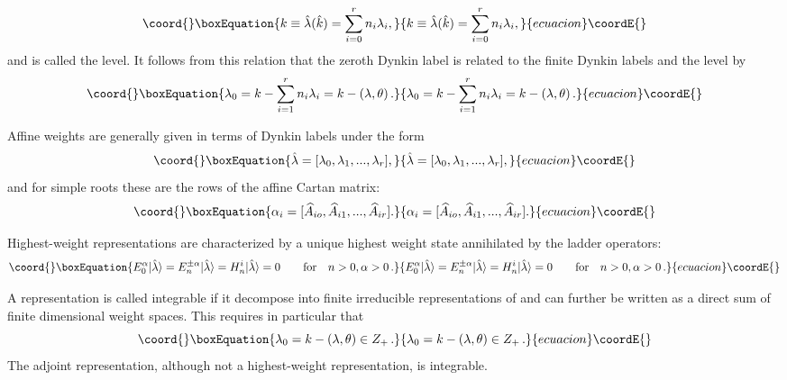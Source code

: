 \documentclass[a4paper,12pt]{report}
\begin{document}
\begin{equation}\coord{}\boxEquation{
k\equiv\hat{\lambda}(\hat{k})=\sum_{i=0}^{r}n_{i}\lambda_{i},
}{
k\equiv\hat{\lambda}(\hat{k})=\sum_{i=0}^{r}n_{i}\lambda_{i},
}{ecuacion}\coordE{}\end{equation}
and \coordHE{} is called the level. It follows from this relation that the zeroth Dynkin label \coordHE{} is related
to the finite Dynkin labels and the level by
\begin{equation}\coord{}\boxEquation{
\lambda_{0}=k-\sum_{i=1}^{r}n_{i}\lambda_{i}=k-(\lambda,\theta)\,.
}{
\lambda_{0}=k-\sum_{i=1}^{r}n_{i}\lambda_{i}=k-(\lambda,\theta)\,.
}{ecuacion}\coordE{}\end{equation}


Affine weights are generally given in terms of Dynkin labels under the form
\begin{equation}\coord{}\boxEquation{
\hat{\lambda}=[\lambda_{0},\lambda_{1},...,\lambda_{r}],
}{
\hat{\lambda}=[\lambda_{0},\lambda_{1},...,\lambda_{r}],
}{ecuacion}\coordE{}\end{equation}
and for simple roots these are the rows of the affine Cartan matrix:
\begin{equation}\coord{}\boxEquation{
\alpha_{i}=[\widehat{A}_{io},\widehat{A}_{i1},...,\widehat{A}_{ir}].
}{
\alpha_{i}=[\widehat{A}_{io},\widehat{A}_{i1},...,\widehat{A}_{ir}].
}{ecuacion}\coordE{}\end{equation}

Highest-weight representations are characterized by a unique highest weight state \myHighlight{$|\hat{\lambda}\rangle$}\coordHE{}
annihilated by the ladder operators:
\begin{equation}\coord{}\boxEquation{
E_{0}^{\alpha}|\hat{\lambda}\rangle=E_{n}^{\pm\alpha}|\hat{\lambda}\rangle=H_{n}^{i}|\hat{\lambda}\rangle=0\qquad\textrm{for}\quad
n>0,\alpha>0\,.
}{
E_{0}^{\alpha}|\hat{\lambda}\rangle=E_{n}^{\pm\alpha}|\hat{\lambda}\rangle=H_{n}^{i}|\hat{\lambda}\rangle=0\qquad\textrm{for}\quad
n>0,\alpha>0\,.
}{ecuacion}\coordE{}\end{equation}



A representation is called integrable if it decompose into finite irreducible representations of \coordHE{} and can
further be written as a direct sum of finite dimensional weight spaces. This requires in particular that
\begin{equation}\coord{}\boxEquation{
\lambda_{0}=k-(\lambda,\theta)\in Z_{+}\,.
}{
\lambda_{0}=k-(\lambda,\theta)\in Z_{+}\,.
}{ecuacion}\coordE{}\end{equation}
The adjoint representation, although not a highest-weight representation, is integrable.
\end{document}
